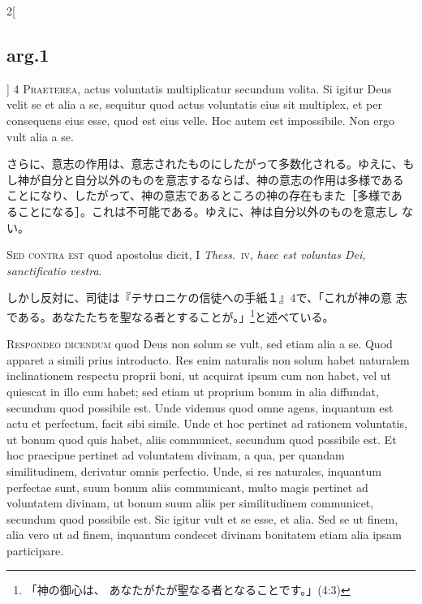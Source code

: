 \documentclass[paper=a4paper,fontsize=10pt,jafontsize=9pt,titlepage]{jlreq}
\begin{document}
\begin{paracol}{2}[\subsection{arg.1}]
{\scshape 4 Praeterea}, actus voluntatis multiplicatur secundum
 volita. Si igitur Deus velit se et alia a se, sequitur quod actus
 voluntatis eius sit multiplex, et per consequens eius esse, quod est
 eius velle. Hoc autem est impossibile. Non ergo vult alia a se.

\switchcolumn

さらに、意志の作用は、意志されたものにしたがって多数化される。ゆえに、も
 し神が自分と自分以外のものを意志するならば、神の意志の作用は多様である
 ことになり、したがって、神の意志であるところの神の存在もまた［多様であ
 ることになる］。これは不可能である。ゆえに、神は自分以外のものを意志し
 ない。

\switchcolumn*[\subsection{s.c.}]


{\scshape  Sed contra est} quod apostolus dicit, I {\itshape Thess}.~{\scshape iv}, {\itshape haec est
 voluntas Dei, sanctificatio vestra}.

\switchcolumn

しかし反対に、司徒は『テサロニケの信徒への手紙１』4で、「これが神の意
 志である。あなたたちを聖なる者とすることが。」\footnote{「神の御心は、
 あなたがたが聖なる者となることです。」(4:3)}と述べている。



{\scshape Respondeo dicendum} quod Deus non solum se vult, sed etiam
 alia a se. Quod apparet a simili prius introducto. Res enim naturalis
 non solum habet naturalem inclinationem respectu proprii boni, ut
 acquirat ipsum cum non habet, vel ut quiescat in illo cum habet; sed
 etiam ut proprium bonum in alia diffundat, secundum quod possibile
 est. Unde videmus quod omne agens, inquantum est actu et perfectum,
 facit sibi simile. Unde et hoc pertinet ad rationem voluntatis, ut
 bonum quod quis habet, aliis communicet, secundum quod possibile
 est. Et hoc praecipue pertinet ad voluntatem divinam, a qua, per
 quandam similitudinem, derivatur omnis perfectio. Unde, si res
 naturales, inquantum perfectae sunt, suum bonum aliis communicant,
 multo magis pertinet ad voluntatem divinam, ut bonum suum aliis per
 similitudinem communicet, secundum quod possibile est. Sic igitur vult
 et se esse, et alia. Sed se ut finem, alia vero ut ad finem, inquantum
 condecet divinam bonitatem etiam alia ipsam participare.


\end{paracol}
\end{document}
